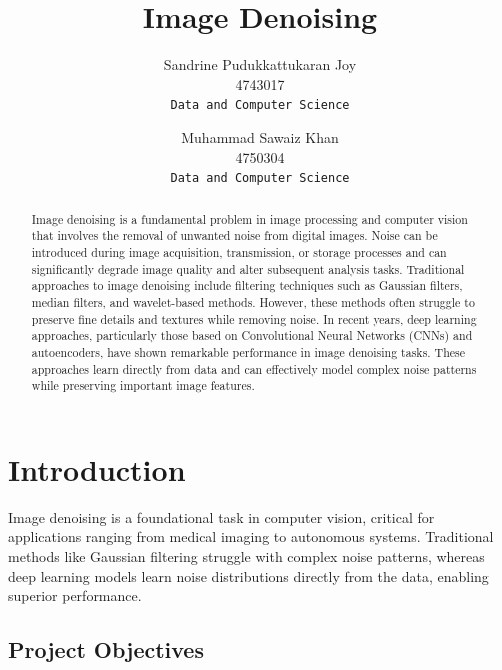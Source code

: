 \documentclass[final]{article}
\begin{document}
\title{Image Denoising}

\author{Sandrine Pudukkattukaran Joy\\
4743017\\
{\tt\small Data and Computer Science}
\and
Muhammad Sawaiz Khan \\
4750304\\
{\tt\small Data and Computer Science}
}

\maketitle


\begin{abstract}
	Image denoising is a fundamental problem in image processing and computer vision that involves the removal of unwanted noise from digital images. Noise can be introduced during image acquisition, transmission, or storage processes and can significantly degrade image quality and alter subsequent analysis tasks. Traditional approaches to image denoising include filtering techniques such as Gaussian filters, median filters, and wavelet-based methods. However, these methods often struggle to preserve fine details and textures while removing noise.
In recent years, deep learning approaches, particularly those based on Convolutional Neural Networks (CNNs) and autoencoders, have shown remarkable performance in image denoising tasks. These approaches learn directly from data and can effectively model complex noise patterns while preserving important image features.

\end{abstract}

\section{Introduction}

Image denoising is a foundational task in computer vision, critical for applications ranging from medical imaging to autonomous systems. Traditional methods like Gaussian filtering struggle with complex noise patterns, whereas deep learning models learn noise distributions directly from the data, enabling superior performance.

\subsection{Project Objectives}
\end{document}
